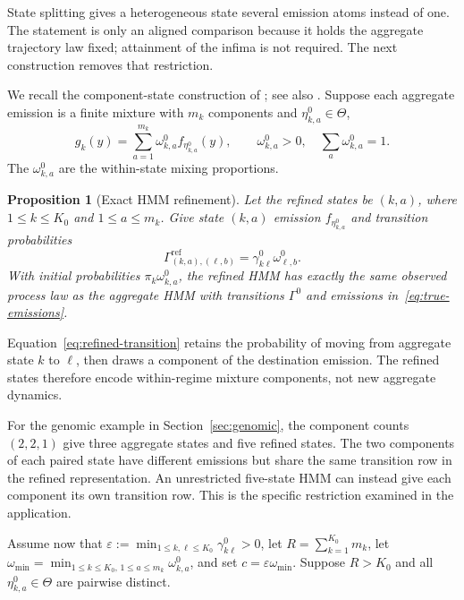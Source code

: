 \documentclass[11pt]{article}
\newtheorem{proposition}[theorem]{Proposition}
\theoremstyle{definition}
\begin{document}
State splitting gives a heterogeneous state several emission atoms
instead of one. The statement is only an aligned comparison because it holds
the aggregate trajectory law fixed; attainment of the infima is not required. The next construction removes that
restriction.

We recall the component-state construction of \citet{VolantEtAl2014};
see also \citet{HolzmannSchwaiger2015}. Suppose each aggregate emission is a
finite mixture with $m_k$ components and $\eta^0_{k,a}\in\Theta$,
\begin{equation}\label{eq:true-emissions}
 g_k(y)=\sum_{a=1}^{m_k}\omega^0_{k,a}f_{\eta^0_{k,a}}(y),
 \qquad \omega^0_{k,a}>0,\quad \sum_a\omega^0_{k,a}=1.
\end{equation}
The $\omega^0_{k,a}$ are the within-state mixing proportions.

\begin{proposition}[Exact HMM refinement]\label{prop:refinement}
Let the refined states be $(k,a)$, where $1\leq k\leq K_0$ and
$1\leq a\leq m_k$. Give state $(k,a)$ emission
$f_{\eta^0_{k,a}}$ and transition probabilities
\begin{equation}\label{eq:refined-transition}
 \Gamma^{\mathrm{ref}}_{(k,a),(\ell,b)}
 =\gamma^0_{k\ell}\omega^0_{\ell,b}.
\end{equation}
With initial probabilities $\pi_k\omega^0_{k,a}$, the refined HMM has exactly
the same observed process law as the aggregate HMM with transitions
$\Gamma^0$ and emissions in~\eqref{eq:true-emissions}.
\end{proposition}

Equation~\eqref{eq:refined-transition} retains the probability of moving from
aggregate state $k$ to $\ell$, then draws a component of the destination
emission. The refined states therefore encode within-regime mixture components,
not new aggregate dynamics.

For the genomic example in Section~\ref{sec:genomic}, the component counts
$(2,2,1)$ give three aggregate states and five refined states. The two
components of each paired state have different emissions but share the same
transition row in the refined representation. An unrestricted five-state
HMM can instead give each component its own transition row. This is the
specific restriction examined in the application.

Assume now that
$\varepsilon:=\min_{1\leq k,\ell\leq K_0}\gamma^0_{k\ell}>0$, let
$R=\sum_{k=1}^{K_0}m_k$, let
$\omega_{\min}=\min_{1\leq k\leq K_0,\,1\leq a\leq m_k}\omega^0_{k,a}$, and set
$c=\varepsilon\omega_{\min}$. Suppose $R>K_0$ and all
$\eta^0_{k,a}\in\Theta$ are pairwise distinct.
\end{document}
